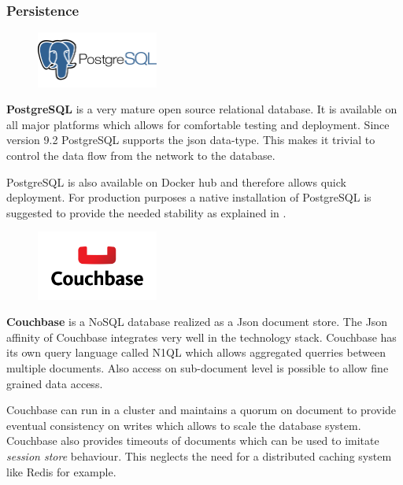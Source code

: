\subsubsection{Persistence}

\begin{figure}
 	\hspace*{0.4cm}
    \includegraphics[width=4cm]{images/dependencies/PostgreSQL}
\end{figure}

\textbf{PostgreSQL} is a very mature open source relational database. It is
available on all major platforms which allows for comfortable testing and
deployment. Since version 9.2 PostgreSQL supports the json data-type. This makes
it trivial to control the data flow from the network to the database.

PostgreSQL is also available on Docker hub and therefore allows quick
deployment. For production purposes a native installation of PostgreSQL is
suggested to provide the needed stability as explained in .\\


\begin{figure}
    \includegraphics[width=4cm]{images/dependencies/couchbase}
\end{figure}

\noindent
\textbf{Couchbase} is a NoSQL database realized as a Json document store. The
Json affinity of Couchbase integrates very well in the technology stack.
Couchbase has its own query language called N1QL which allows aggregated
querries between multiple documents. Also access on sub-document level is
possible to allow fine grained data access.

Couchbase can run in a cluster and maintains a quorum on document to provide
eventual consistency on writes which allows to scale the database system.
Couchbase also provides timeouts of documents which can be used to imitate
\textit{session store} behaviour. This neglects the need for a distributed
caching system like Redis for example. 

